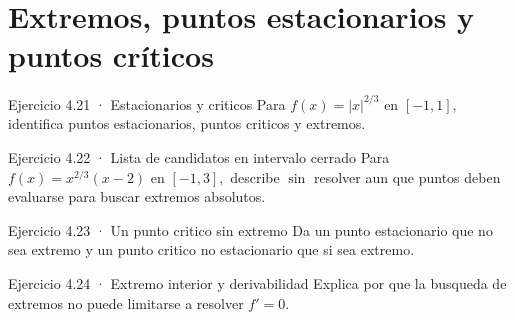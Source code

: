 \documentclass[10pt,a4paper,oneside,openany]{book}
\begin{document}
\section{Extremos, puntos estacionarios y puntos críticos}
\begin{PSevenExerciseFixed}{Ejercicio 4.21 · Estacionarios y criticos}
Para \(f(x)=|x|^{2/3}\) en \([-1,1],\) identifica puntos estacionarios, puntos criticos y extremos.
\end{PSevenExerciseFixed}
\begin{PSevenExerciseFixed}{Ejercicio 4.22 · Lista de candidatos en intervalo cerrado}
Para \(f(x)=x^{2/3}(x-2)\) en \([-1,3],\) describe \(\sin\) resolver aun que puntos deben evaluarse para buscar extremos absolutos.
\end{PSevenExerciseFixed}
\begin{PSevenExerciseFixed}{Ejercicio 4.23 · Un punto critico sin extremo}
Da un punto estacionario que no sea extremo y un punto critico no estacionario que si sea extremo.
\end{PSevenExerciseFixed}
\begin{PSevenExerciseFixed}{Ejercicio 4.24 · Extremo interior y derivabilidad}
Explica por que la busqueda de extremos no puede limitarse a resolver \(f'=0\).
\end{PSevenExerciseFixed}
\end{document}
